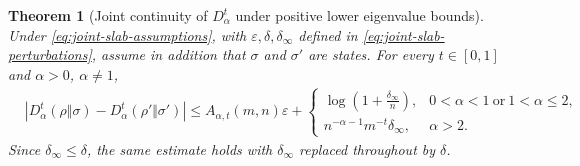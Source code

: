 \documentclass[11pt]{article}
\newtheorem{theorem}[theorem]{Theorem}
\theoremstyle{remark}
\newcommand{\1}{\mathbbm{1}}
\begin{document}
\begin{theorem}[Joint continuity of $D_\alpha^t$ under positive lower
eigenvalue bounds]
\label{theo:joint-slab-Dalpha-continuity}
Under \eqref{eq:joint-slab-assumptions}, with
$\varepsilon,\delta,\delta_\infty$ defined in
\eqref{eq:joint-slab-perturbations}, assume in addition that $\sigma$
and $\sigma'$ are states.  For every $t\in[0,1]$ and $\alpha>0$,
$\alpha\neq1$,
\begin{equation}
 \begin{aligned}
 &\left|D_\alpha^t(\rho\Vert\sigma)
       -D_\alpha^t(\rho'\Vert\sigma')\right|\leq A_{\alpha,t}(m,n)\varepsilon
 +\begin{cases}
 \displaystyle\log\left(1+\frac{\delta_\infty}{n}\right),
 &0<\alpha<1\ \text{or}\ 1<\alpha\leq2,\\[2mm]
 \displaystyle n^{-\alpha-1}m^{-t}\delta_\infty,
 &\alpha>2.
 \end{cases}
 \end{aligned}
 \label{eq:joint-slab-Dalpha-bound}
\end{equation}
Since $\delta_\infty\leq\delta$, the same estimate holds with
$\delta_\infty$ replaced throughout by $\delta$.
\end{theorem}
\end{document}
